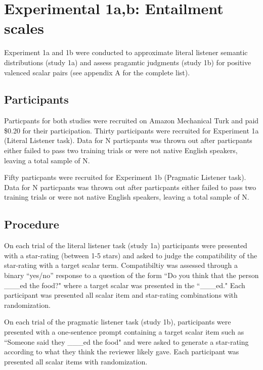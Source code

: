 \documentclass[10pt, letterpaper]{article}
\begin{document}
\section{Experimental 1a,b: Entailment
scales}\label{experimental-1ab-entailment-scales}

Experiment 1a and 1b were conducted to approximate literal listener
semantic distributions (study 1a) and assess pragamtic judgments (study
1b) for positive valenced scalar pairs (see appendix A for the complete
list).

\subsection{Participants}\label{participants}

Particpants for both studies were recruited on Amazon Mechanical Turk
and paid \$0.20 for their participation. Thirty participants were
recruited for Experiment 1a (Literal Listener task). Data for N
particpants was thrown out after particpants either failed to pass two
training trials or were not native English speakers, leaving a total
sample of N.

Fifty particpants were recruited for Experiment 1b (Pragmatic Listener
task). Data for N particpants was thrown out after particpants either
failed to pass two training trials or were not native English speakers,
leaving a total sample of N.

\subsection{Procedure}\label{procedure}

On each trial of the literal listener task (study 1a) participants were
presented with a star-rating (between 1-5 stars) and asked to judge the
compatibility of the star-rating with a target scalar term.
Compatibiltiy was assessed through a binary ``yes/no'' response to a
question of the form ``Do you think that the person \_\_\_ed the food?"
where a target scalar was presented in the ``\_\_\_ed." Each participant
was presented all scalar item and star-rating combinations with
randomization.

On each trial of the pragmatic listener task (study 1b), participants
were presented with a one-sentence prompt containing a target scalar
item such as ``Someone said they \_\_\_ed the food" and were asked to
generate a star-rating according to what they think the reviewer likely
gave. Each participant was presented all scalar items with
randomization.
\end{document}
